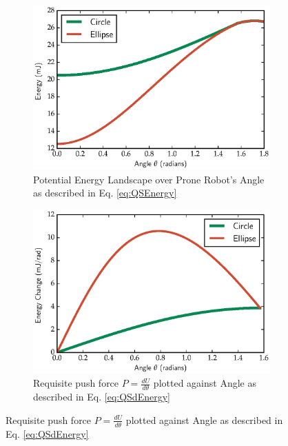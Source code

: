 \documentclass[letterpaper, 10 pt, conference]{ieeeconf}
\begin{document}
\begin{figure}[ht]
  \centering
  \begin{subfigure}[t]{0.45\columnwidth}
    \centering
    \includegraphics[width=1.0\columnwidth]{EnergyLandscape.eps}
    \caption{\label{fig:QSEnergy}Potential Energy Landscape over Prone Robot's Angle as described in Eq. \ref{eq:QSEnergy}}
  \end{subfigure}
  \hfill
  \begin{subfigure}[t]{0.45\columnwidth}
    \centering
    \includegraphics[width=1.0\columnwidth]{dEnergyLandscape.eps}
    \caption{\label{fig:QSdEnergy}Requisite push force $P = \frac{d U}{d \theta}$ plotted against Angle as described in Eq. \ref{eq:QSdEnergy}}
  \end{subfigure}
\end{figure}
\end{document}
